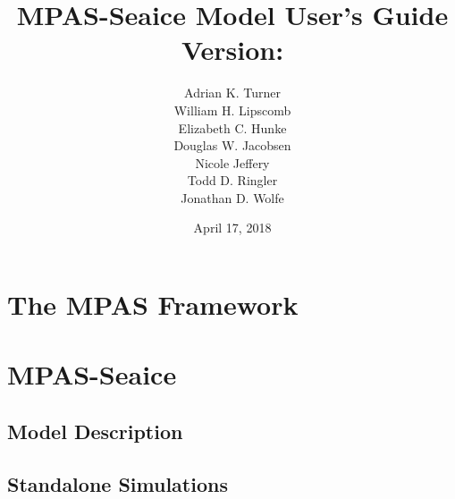 \documentclass[11pt]{report}
\newcommand\BackgroundPic{%
	\put(0,0){%
		\parbox[b][\paperheight]{\paperwidth}{%
			\centering
			\texttt{[image: ocean/figures/MPAS\_LOGO\_Ocean.png]}%
			\vfill
			\texttt{[image: ocean/figures/cover\_V3\_KE\_NA37-7km\_cropped\_d.png]}%
}}}
\begin{document}

\title{
\Huge MPAS-Seaice Model User's Guide \\
\LARGE Version: \version
}




\author{
\begin{tabular}{c}
Adrian K. Turner \tabularnewline
William H. Lipscomb \tabularnewline
Elizabeth C. Hunke \tabularnewline
Douglas W. Jacobsen \tabularnewline
Nicole Jeffery \tabularnewline
Todd D. Ringler \tabularnewline
Jonathan D. Wolfe
\end{tabular}
}

\date{April 17, 2018}

\maketitle

%


\tableofcontents

\part{The MPAS Framework}






\part{MPAS-Seaice}

\chapter{Model Description}
\label{chap:model_description}








\chapter{Standalone Simulations}
\label{chap:standalone_simulations}
\end{document}
